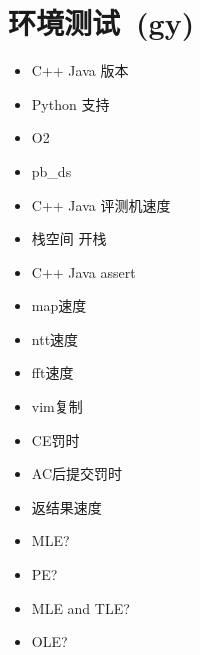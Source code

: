 \section{环境测试\ \small(gy)}
    \begin{itemize}
        \item C++ Java 版本
        \item Python 支持
        \item O2
        \item pb\_ds
        \item C++ Java 评测机速度
        \item 栈空间 开栈
        \item C++ Java assert
        \item map速度
        \item ntt速度
        \item fft速度
        \item vim复制
        \item CE罚时
        \item AC后提交罚时
        \item 返结果速度
        \item MLE?
        \item PE?
        \item MLE and TLE?
        \item OLE?
    \end{itemize}
